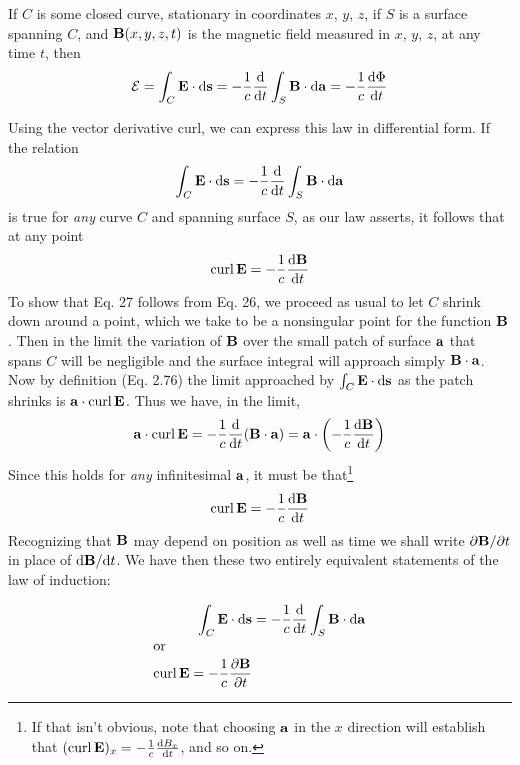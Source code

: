 \begin{framed}
If $C$ is some closed curve, stationary in coordinates
$x$, $y$, $z$, if $S$ is a surface spanning $C$, and $\mathbf{B}(x,y,z,t)$ is the
magnetic field measured in $x$, $y$, $z$, at any time $t$, then
\begin{equation}
  \mathcal{E} = \int_C \mathbf{E}\cdot\textup{d}\mathbf{s} = -\frac{1}{c}\frac{\textup{d}}{\textup{d} t}\int_S \mathbf{B}\cdot\textup{d}\mathbf{a}
       = -\frac{1}{c}\frac{\textup{d}\Phi}{\textup{d} t}
\end{equation}
\end{framed}

Using the vector derivative curl, we can express this law in differential
form. If the relation
\begin{equation}
  \int_C \mathbf{E}\cdot\textup{d}\mathbf{s} = -\frac{1}{c}\frac{\textup{d}}{\textup{d} t}\int_S \mathbf{B}\cdot\textup{d}\mathbf{a}
\end{equation}
is true for \emph{any} curve $C$ and spanning surface $S$, as our law asserts, it
follows that at any point
\begin{equation}
  \operatorname{curl}\mathbf{E} = -\frac{1}{c}\frac{\textup{d}\mathbf{B}}{\textup{d} t}
\end{equation}
To show that Eq. 27 follows from Eq. 26, we proceed as usual to let $C$
shrink down around a point, which we take to be a nonsingular
point for the function $\mathbf{B}$. Then in the limit the variation of $\mathbf{B}$ over the
small patch of surface $\mathbf{a}$ that spans $C$ will be negligible and the surface
integral will approach simply $\mathbf{B}\cdot\mathbf{a}$. Now by definition (Eq. 2.76)
the limit approached by $\int_C\mathbf{E}\cdot\textup{d}\mathbf{s}$ as the patch shrinks is $\mathbf{a}\cdot\operatorname{curl}\mathbf{E}$.
Thus we have, in the limit,
\begin{equation}
  \mathbf{a}\cdot\operatorname{curl}\mathbf{E} = -\frac{1}{c}\frac{\textup{d}}{\textup{d} t}(\mathbf{B}\cdot\mathbf{a})
        = \mathbf{a}\cdot\left(-\frac{1}{c}\frac{\textup{d}\mathbf{B}}{\textup{d} t}\right)
\end{equation}
Since this holds for \emph{any} infinitesimal $\mathbf{a}$,
it must be that\footnote{If that isn't obvious, note that choosing $\mathbf{a}$ in the $x$
direction will establish that
$(\operatorname{curl}\mathbf{E})_x = -\frac{1}{c}\frac{\textup{d} B_x}{\textup{d} t}$, and so on.}
\begin{equation}
  \operatorname{curl}\mathbf{E} = -\frac{1}{c}\frac{\textup{d}\mathbf{B}}{\textup{d} t}
\end{equation}
Recognizing that $\mathbf{B}$ may depend on position as well as time we shall
write $\partial\mathbf{B}/\partial t$ in place of $\textup{d} \mathbf{B}/\textup{d} t$. We have then these two entirely
equivalent statements of the law of induction:
\begin{framed}
\begin{align}
  \int_C \mathbf{E}\cdot\textup{d}\mathbf{s} &= -\frac{1}{c}\frac{\textup{d}}{\textup{d} t}\int_S \mathbf{B}\cdot\textup{d}\mathbf{a} \\
\intertext{or}
  \operatorname{curl}\mathbf{E} = -\frac{1}{c}\frac{\partial\mathbf{B}}{\partial t}
\end{align}
\end{framed}
